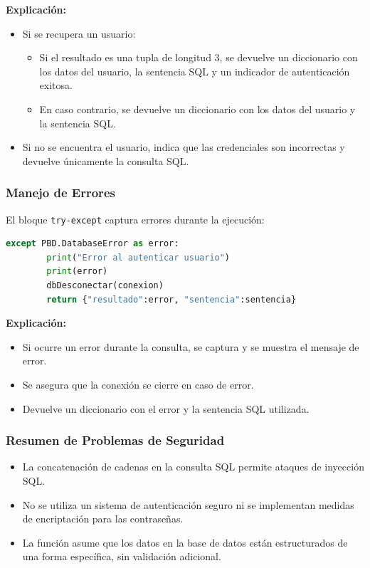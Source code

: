\documentclass[a4paper,12pt]{article}
\begin{document}
\textbf{Explicación:}
\begin{itemize}
    \item Si se recupera un usuario:
    \begin{itemize}
        \item Si el resultado es una tupla de longitud 3, se devuelve un diccionario con los datos del usuario, la sentencia SQL y un indicador de autenticación exitosa.
        \item En caso contrario, se devuelve un diccionario con los datos del usuario y la sentencia SQL.
    \end{itemize}
    \item Si no se encuentra el usuario, indica que las credenciales son incorrectas y devuelve únicamente la consulta SQL.
\end{itemize}

\subsubsection{Manejo de Errores}
El bloque \texttt{try-except} captura errores durante la ejecución:

\begin{lstlisting}[language=Python]
    except PBD.DatabaseError as error:
        print("Error al autenticar usuario")
        print(error)
        dbDesconectar(conexion)
        return {"resultado":error, "sentencia":sentencia}
\end{lstlisting}

\textbf{Explicación:}
\begin{itemize}
    \item Si ocurre un error durante la consulta, se captura y se muestra el mensaje de error.
    \item Se asegura que la conexión se cierre en caso de error.
    \item Devuelve un diccionario con el error y la sentencia SQL utilizada.
\end{itemize}

\subsubsection{Resumen de Problemas de Seguridad}
\begin{itemize}
    \item La concatenación de cadenas en la consulta SQL permite ataques de inyección SQL.
    \item No se utiliza un sistema de autenticación seguro ni se implementan medidas de encriptación para las contraseñas.
    \item La función asume que los datos en la base de datos están estructurados de una forma específica, sin validación adicional.
\end{itemize}
\end{document}
